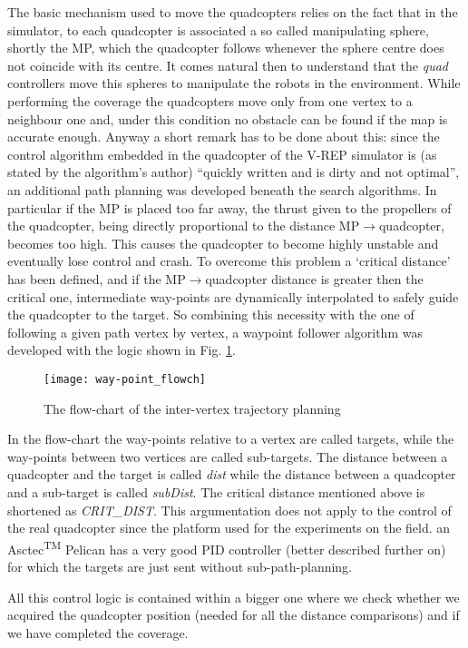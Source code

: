 The basic mechanism used to move the quadcopters relies on the fact that in the simulator, to each quadcopter is associated a so called manipulating sphere, shortly the MP, which the quadcopter follows whenever the sphere centre does not coincide with its centre. It comes natural then to understand that the \emph{quad} controllers move this spheres to manipulate the robots in the environment. 
While performing the coverage the quadcopters move only from one vertex to a neighbour one and, under this condition no obstacle can be found if the map is accurate enough. Anyway a short remark has to be done about this: since the control algorithm embedded in the quadcopter of the V-REP simulator is (as stated by the algorithm's author) ``quickly written and is dirty and not optimal'', an additional path planning was developed beneath the search algorithms.
In particular if the MP is placed too far away, the thrust given to the propellers of the quadcopter, being directly proportional to the distance MP$\rightarrow$quadcopter, becomes too high. This causes the quadcopter to become highly unstable and eventually lose control and crash. To overcome this problem a `critical distance' has been defined, and if the MP$\rightarrow$quadcopter distance is greater then the critical one, intermediate way-points are dynamically interpolated to safely guide the quadcopter to the target.
So combining this necessity with the one of following a given path vertex by vertex, a waypoint follower algorithm was developed with the logic shown in Fig. \ref{fig:wp_flowch}.


\begin{figure}[t]
\centering
\texttt{[image: way-point\_flowch]}
\caption{The flow-chart of the inter-vertex trajectory planning}
\label{fig:wp_flowch}
\end{figure}

In the flow-chart the way-points relative to a vertex are called targets, while the \mbox{way-points} between two vertices are called sub-targets. The distance between a quadcopter and the target is called \textit{dist} while the distance between a quadcopter and a sub-target is called \textit{subDist}. The critical distance mentioned above is shortened as \textit{CRIT\_DIST}.
This argumentation does not apply to the control of the real quadcopter since the platform used for the experiments on the field. an Asctec\textsuperscript{TM} Pelican has a very good PID controller (better described further on) for which the targets are just sent without sub-path-planning.

All this control logic is contained within a bigger one where we check whether we acquired the quadcopter position (needed for all the distance comparisons) and if we have completed the coverage.
